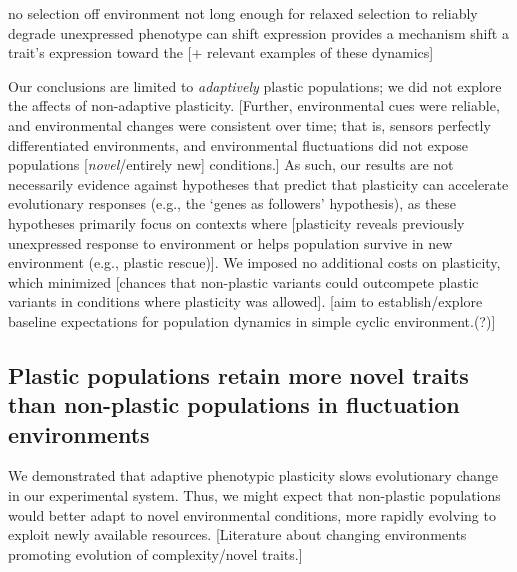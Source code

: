 no selection
off environment not long enough for relaxed selection to reliably degrade unexpressed phenotype
can shift expression  provides a mechanism  shift a trait's expression toward the 
[+ relevant examples of these dynamics]

Our conclusions are limited to \textit{adaptively} plastic populations; we did not explore the affects of non-adaptive plasticity.
[Further, environmental cues were reliable, and environmental changes were consistent over time; that is, sensors perfectly differentiated environments, and environmental fluctuations did not expose populations [\textit{novel}/entirely new] conditions.]
As such, our results are not necessarily evidence against hypotheses that predict that plasticity can accelerate evolutionary responses (e.g., the `genes as followers' hypothesis), as these hypotheses primarily focus on contexts where [plasticity reveals previously unexpressed response to environment or helps population survive in new environment (e.g., plastic rescue)].
We imposed no additional costs on plasticity, which minimized [chances that non-plastic variants could outcompete plastic variants in conditions where plasticity was allowed].
[aim to establish/explore baseline expectations for population dynamics in simple cyclic environment.(?)]

\subsection{Plastic populations retain more novel traits than non-plastic populations in fluctuation environments}

We demonstrated that adaptive phenotypic plasticity slows evolutionary change in our experimental system. 
Thus, we might expect that non-plastic populations would better adapt to novel environmental conditions, more rapidly evolving to exploit newly available resources.
[Literature about changing environments promoting evolution of complexity/novel traits.]

